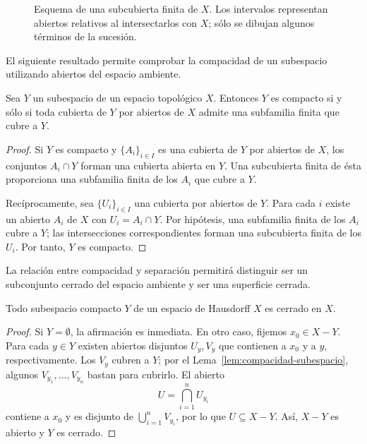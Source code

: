 \begin{figure}[ht]
    \centering
    \caption{Esquema de una subcubierta finita de $X$. Los intervalos representan abiertos relativos al intersectarlos con $X$; sólo se dibujan algunos términos de la sucesión.}
    \label{fig:compacto}
\end{figure}
El siguiente resultado permite comprobar la compacidad de un subespacio utilizando abiertos del espacio ambiente.
\begin{lemma}
\label{lem:compacidad-subespacio}
Sea $Y$ un subespacio de un espacio topológico $X$. Entonces $Y$ es compacto si y sólo si toda cubierta de $Y$ por abiertos de $X$ admite una subfamilia finita que cubre a $Y$.
\end{lemma}
\begin{proof}
Si $Y$ es compacto y $\{A_i\}_{i\in I}$ es una cubierta de $Y$ por abiertos de $X$, los conjuntos $A_i\cap Y$ forman una cubierta abierta en $Y$. Una subcubierta finita de ésta proporciona una subfamilia finita de los $A_i$ que cubre a $Y$.

Recíprocamente, sea $\{U_i\}_{i\in I}$ una cubierta por abiertos de $Y$. Para cada $i$ existe un abierto $A_i$ de $X$ con $U_i=A_i\cap Y$. Por hipótesis, una subfamilia finita de los $A_i$ cubre a $Y$; las intersecciones correspondientes forman una subcubierta finita de los $U_i$. Por tanto, $Y$ es compacto.
\end{proof}

La relación entre compacidad y separación permitirá distinguir ser un subconjunto cerrado del espacio ambiente y ser una superficie cerrada.
\begin{teorema}
\label{teo:compactos-cerrados-hausdorff}
Todo subespacio compacto $Y$ de un espacio de Hausdorff $X$ es cerrado en $X$.
\end{teorema}
\begin{proof}
Si $Y=\emptyset$, la afirmación es inmediata. En otro caso, fijemos $x_0\in X-Y$. Para cada $y\in Y$ existen abiertos disjuntos $U_y,V_y$ que contienen a $x_0$ y a $y$, respectivamente. Los $V_y$ cubren a $Y$; por el Lema~\ref{lem:compacidad-subespacio}, algunos $V_{y_1},\ldots,V_{y_n}$ bastan para cubrirlo. El abierto
\[
U=\bigcap_{i=1}^{n}U_{y_i}
\]
contiene a $x_0$ y es disjunto de $\bigcup_{i=1}^{n}V_{y_i}$, por lo que $U\subseteq X-Y$. Así, $X-Y$ es abierto y $Y$ es cerrado.
\end{proof}


